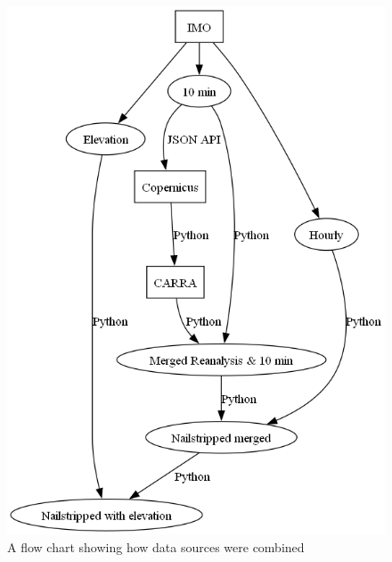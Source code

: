 \begin{figure}[h]
    \caption{A flow chart showing how data sources were combined}
    \label{fig:data_preprocessing_flow_chart}
    \includegraphics[scale = 0.5]{Figures/data-preprocessing-flow-chart.png}
\end{figure}


